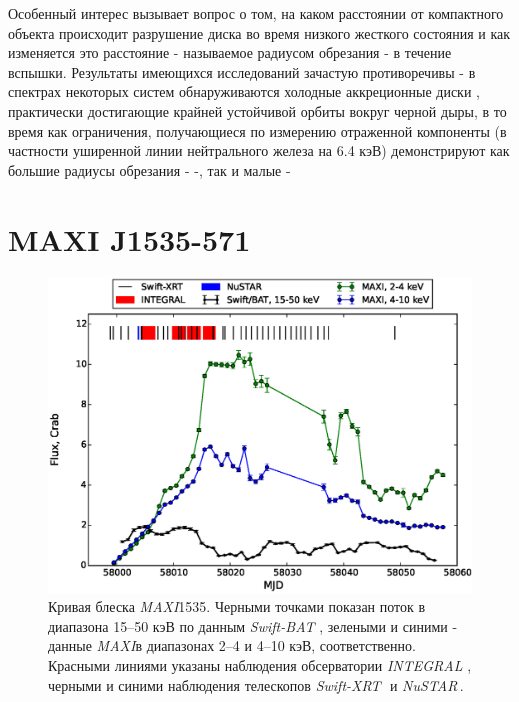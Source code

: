 \documentclass{pazhb}
\def\maxi1535{MAXI\,J1535-571}
\def\maxi{{\em MAXI}}
\def\swiftx{{\em Swift-XRT\,}}
\def\swiftb{{\em Swift-BAT\,}}
\def\nustar{{\em NuSTAR\,}}
\def\integral{{\em INTEGRAL\,}}
\begin{document}
Особенный интерес вызывает вопрос о том, на каком расстоянии от компактного объекта происходит разрушение диска во время низкого жесткого состояния и как изменяется это расстояние - называемое радиусом обрезания - в течение вспышки. Результаты имеющихся исследований зачастую противоречивы - в спектрах некоторых систем обнаруживаются холодные аккреционные диски \citep[с температурой в 0.1..0.5 кэВ:][]{miller06, miller06gx339,reis11}, практически достигающие крайней устойчивой орбиты вокруг черной дыры, в то время как ограничения, получающиеся по измерению отраженной компоненты (в частности уширенной линии нейтрального железа на 6.4 кэВ) демонстрируют как большие радиусы обрезания - -, так и малые - \cite{miller15_grs}



\section{MAXI J1535-571}


\begin{figure}
\centerline{\includegraphics[scale=0.75]{overall_lc_v01.eps}}
\caption{Кривая блеска \maxi1535. Черными точками показан поток в диапазона 15--50 кэВ по данным \swiftb\,, зелеными и синими - данные \maxi в диапазонах 2--4 и 4--10 кэВ, соответственно. Красными линиями указаны наблюдения обсерватории \integral\,, черными и синими наблюдения телескопов \swiftx\, и \nustar. } 
\label{fig:lc}
\end{figure} 




\acknowledgements

\label{lastpage}




\end{document}
